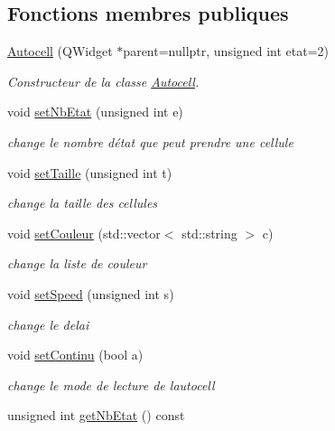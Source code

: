 \subsection*{Fonctions membres publiques}
\begin{DoxyCompactItemize}
\item 
\hyperlink{class_autocell_a43f55284a9ec07e5d0619a87391d7cc7}{Autocell} (Q\+Widget $\ast$parent=nullptr, unsigned int etat=2)
\begin{DoxyCompactList}\small\item\em Constructeur de la classe \hyperlink{class_autocell}{Autocell}. \end{DoxyCompactList}\item 
void \hyperlink{class_autocell_a62154f66156d8abbde2dab84cc2b6b5d}{set\+Nb\+Etat} (unsigned int e)
\begin{DoxyCompactList}\small\item\em change le nombre d\textquotesingle{}état que peut prendre une cellule \end{DoxyCompactList}\item 
void \hyperlink{class_autocell_a8e1fab78b4369eceedad58ddee63ae78}{set\+Taille} (unsigned int t)
\begin{DoxyCompactList}\small\item\em change la taille des cellules \end{DoxyCompactList}\item 
void \hyperlink{class_autocell_ac1dd89aa8d881471b06802b2d780474a}{set\+Couleur} (std\+::vector$<$ std\+::string $>$ c)
\begin{DoxyCompactList}\small\item\em change la liste de couleur \end{DoxyCompactList}\item 
void \hyperlink{class_autocell_a5f449aec7927c7225ff22857d92e970d}{set\+Speed} (unsigned int s)
\begin{DoxyCompactList}\small\item\em change le delai \end{DoxyCompactList}\item 
void \hyperlink{class_autocell_af8ec313790f53cf4a3abbc688c2b307d}{set\+Continu} (bool a)
\begin{DoxyCompactList}\small\item\em change le mode de lecture de l\textquotesingle{}autocell \end{DoxyCompactList}\item 
unsigned int \hyperlink{class_autocell_a342d76cd9ff9ee3b9942a7917c12a435}{get\+Nb\+Etat} () const 

\end{DoxyCompactItemize}
